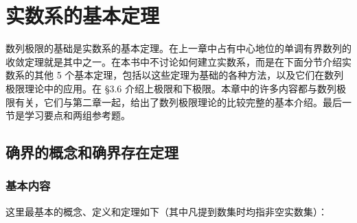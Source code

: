 \chapter{实数系的基本定理}


数列极限的基础是实数系的基本定理。在上一章中占有中心地位的单调有界数列的收敛定理就是其中之一。在本书中不讨论如何建立实数系，而是在下面分节介绍实数系的其他 5 个基本定理，包括以这些定理为基础的各种方法，以及它们在数列极限理论中的应用。在 §3.6 介绍上极限和下极限。本章中的许多内容都与数列极限有关，它们与第二章一起，给出了数列极限理论的比较完整的基本介绍。最后一节是学习要点和两组参考题。

\section{确界的概念和确界存在定理}

\subsection{基本内容}

这里最基本的概念、定义和定理如下（其中凡提到数集时均指非空实数集）：

